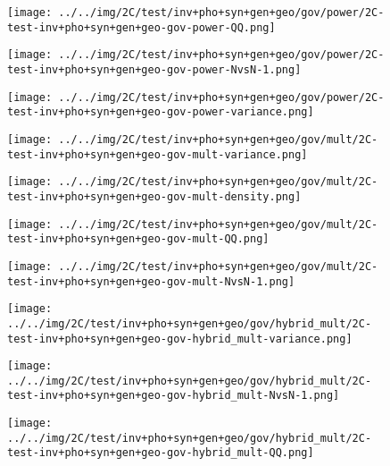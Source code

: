 \begin{figure}[H]
\centering	\texttt{[image: ../../img/2C/test/inv+pho+syn+gen+geo/gov/power/2C-test-inv+pho+syn+gen+geo-gov-power-QQ.png]}
\end{figure}
\begin{figure}[H]
\centering	\texttt{[image: ../../img/2C/test/inv+pho+syn+gen+geo/gov/power/2C-test-inv+pho+syn+gen+geo-gov-power-NvsN-1.png]}
\end{figure}
\begin{figure}[H]
\centering	\texttt{[image: ../../img/2C/test/inv+pho+syn+gen+geo/gov/power/2C-test-inv+pho+syn+gen+geo-gov-power-variance.png]}
\end{figure}
\begin{figure}[H]
\centering	\texttt{[image: ../../img/2C/test/inv+pho+syn+gen+geo/gov/mult/2C-test-inv+pho+syn+gen+geo-gov-mult-variance.png]}
\end{figure}
\begin{figure}[H]
\centering	\texttt{[image: ../../img/2C/test/inv+pho+syn+gen+geo/gov/mult/2C-test-inv+pho+syn+gen+geo-gov-mult-density.png]}
\end{figure}
\begin{figure}[H]
\centering	\texttt{[image: ../../img/2C/test/inv+pho+syn+gen+geo/gov/mult/2C-test-inv+pho+syn+gen+geo-gov-mult-QQ.png]}
\end{figure}
\begin{figure}[H]
\centering	\texttt{[image: ../../img/2C/test/inv+pho+syn+gen+geo/gov/mult/2C-test-inv+pho+syn+gen+geo-gov-mult-NvsN-1.png]}
\end{figure}
\begin{figure}[H]
\centering	\texttt{[image: ../../img/2C/test/inv+pho+syn+gen+geo/gov/hybrid\_mult/2C-test-inv+pho+syn+gen+geo-gov-hybrid\_mult-variance.png]}
\end{figure}
\begin{figure}[H]
\centering	\texttt{[image: ../../img/2C/test/inv+pho+syn+gen+geo/gov/hybrid\_mult/2C-test-inv+pho+syn+gen+geo-gov-hybrid\_mult-NvsN-1.png]}
\end{figure}
\begin{figure}[H]
\centering	\texttt{[image: ../../img/2C/test/inv+pho+syn+gen+geo/gov/hybrid\_mult/2C-test-inv+pho+syn+gen+geo-gov-hybrid\_mult-QQ.png]}
\end{figure}
